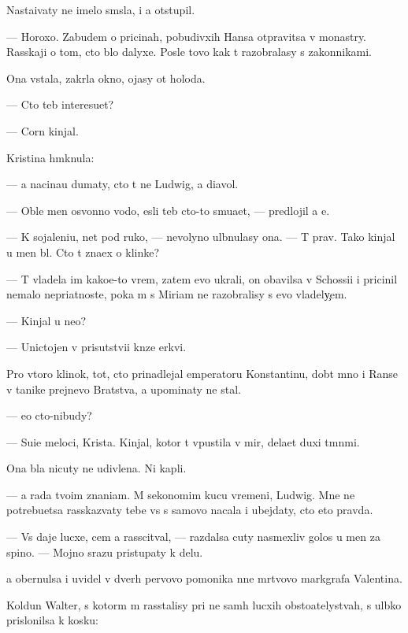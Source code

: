 \documentclass[10pt]{book}
\begin{document}
Nasta{\y}ivaty ne imelo sm{\yi}sla, i {\y}a otstupil.

— Horoxo. Zabudem o pricinah, pobudivxih Hansa otpravitsa v monast{\yi}ry. Ras\-ska\-ji o tom, cto b{\yi}lo dalyxe. Posle tovo kak t{\yi} razobralasy s zakonnikami.

Ona vstala, zakr{\yi}la okno, {\y}ojasy ot holoda.

— Cto teb{\ia} interesu{\y}et?

—  Corn{\yi}{\y} kinjal.

Kristina hm{\yi}knula:

— {\Y}a nacina{\y}u dumaty, cto t{\yi} ne Ludwig, a diavol.

— Oble{\y} men{\ia} osv{\ia}{\x}onno{\y} vodo{\y}, {\y}esli teb{\ia} cto-to smu{\x}a{\y}et, — predlojil {\y}a {\y}e{\y}.

— K sojaleni{\y}u, net pod ruko{\y}, — nevolyno ul{\yi}bnulasy ona. — T{\yi} prav. Tako{\y} kinjal u men{\ia} b{\yi}l. Cto t{\yi} zna\-{\y}ex o klinke?

— T{\yi} vladela im kako{\y}e-to vrem{\ia}, zatem {\y}evo ukrali, on ob{\y}avilsa v Schossi{\y}i i pricinil nemalo nepri{\y}atnoste{\y}, poka m{\yi} s Mi\-ri\-am ne razobralisy s {\y}evo vladely{\c}em.

— Kinjal u ne{\y}o?

— Unictojen v prisutstvi{\y}i kn{\ia}ze{\y} {\C}erkvi.

Pro vtoro{\y} klinok, tot, cto prinadlejal emperatoru Konstantinu, dob{\yi}t{\yi}{\y} mno{\y} i Ranse v ta{\y}nike prejnevo Bratstva, {\y}a upominaty ne stal.

— {\Y}e{\x}o cto-nibudy?

— Su{\x}i{\y}e meloci, Krista. Kinjal, kotor{\yi}{\y} t{\yi} v{\yi}pustila v mir, dela{\y}et duxi t{\e}m\-n{\yi}\-mi.

Ona b{\yi}la nicuty ne udivlena. Ni kapli.

— {\Y}a rada tvo{\y}im znani{\y}am. M{\yi} sekonomim kucu vremeni, Ludwig. Mne ne potrebu{\y}etsa rasskaz{\yi}vaty tebe vs{\e} s samovo nacala i ubejdaty, cto eto pravda.

— Vs{\e} daje lucxe, cem {\y}a rasscit{\yi}val, — razdalsa cuty nasmexliv{\yi}{\y} golos u men{\ia} za spino{\y}. — Mojno srazu pristupaty k delu.

{\Y}a obernulsa i uvidel v dver{\ia}h pervovo pomo{\x}nika n{\yi}ne m{\e}rtvovo markgrafa Valentina.

Koldun Walter, s kotor{\yi}m m{\yi} rasstalisy pri ne sam{\yi}h lucxih obsto{\y}atelystvah, s ul{\yi}bko{\y} prislonilsa k kos{\ia}ku:
\end{document}
